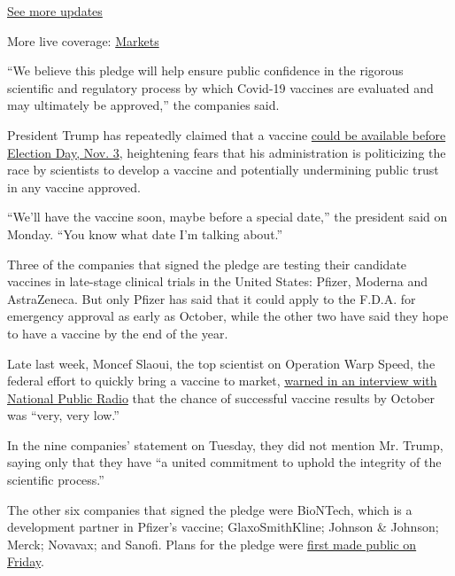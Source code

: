 \href{https://www.nytimes3xbfgragh.onion/2020/09/08/world/covid-19-coronavirus.html?action=click\&pgtype=Article\&state=default\&region=MAIN_CONTENT_1\&context=storylines_live_updates}{See
more updates}

More live coverage:
\href{https://www.nytimes3xbfgragh.onion/live/2020/09/08/business/stock-market-today-coronavirus?action=click\&pgtype=Article\&state=default\&region=MAIN_CONTENT_1\&context=storylines_live_updates}{Markets}

``We believe this pledge will help ensure public confidence in the
rigorous scientific and regulatory process by which Covid-19 vaccines
are evaluated and may ultimately be approved,'' the companies said.

President Trump has repeatedly claimed that a vaccine
\href{https://www.nytimes3xbfgragh.onion/2020/09/02/health/covid-19-vaccine-cdc-plans.html}{could
be available before Election Day, Nov. 3}, heightening fears that his
administration is politicizing the race by scientists to develop a
vaccine and potentially undermining public trust in any vaccine
approved.

``We'll have the vaccine soon, maybe before a special date,'' the
president said on Monday. ``You know what date I'm talking about.''

Three of the companies that signed the pledge are testing their
candidate vaccines in late-stage clinical trials in the United States:
Pfizer, Moderna and AstraZeneca. But only Pfizer has said that it could
apply to the F.D.A. for emergency approval as early as October, while
the other two have said they hope to have a vaccine by the end of the
year.

Late last week, Moncef Slaoui, the top scientist on Operation Warp
Speed, the federal effort to quickly bring a vaccine to market,
\href{https://www.npr.org/2020/09/03/909312697/operation-warp-speed-top-adviser-on-the-status-of-a-coronavirus-vaccine}{warned
in an interview with National Public Radio} that the chance of
successful vaccine results by October was ``very, very low.''

In the nine companies' statement on Tuesday, they did not mention Mr.
Trump, saying only that they have ``a united commitment to uphold the
integrity of the scientific process.''

The other six companies that signed the pledge were BioNTech, which is a
development partner in Pfizer's vaccine; GlaxoSmithKline; Johnson \&
Johnson; Merck; Novavax; and Sanofi. Plans for the pledge were
\href{https://www.nytimes3xbfgragh.onion/2020/09/04/science/covid-vaccine-pharma-pledge.html}{first
made public on Friday}.


